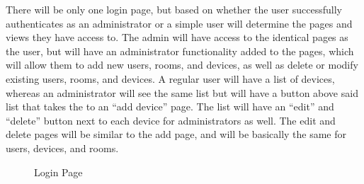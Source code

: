 \documentclass{report}
\begin{document}
\newline
\indent
There will be only one login page, but based on whether the user successfully authenticates as an administrator or a simple user will determine the pages and views they have access to.  The admin will have access to the identical pages as the user, but will have an administrator functionality added to the pages, which will allow them to add new users, rooms, and devices, as well as delete or modify existing users, rooms, and devices. A regular user will have a list of devices, whereas an administrator will see the same list but will have a button above said list that takes the to an “add device” page.  The list will have an “edit” and “delete” button next to each device for administrators as well. The edit and delete pages will be similar to the add page, and will be basically the same for users, devices, and rooms. 
\begin{figure}[H]
\caption{Login Page}
\end{figure}
\newpage
\end{document}
